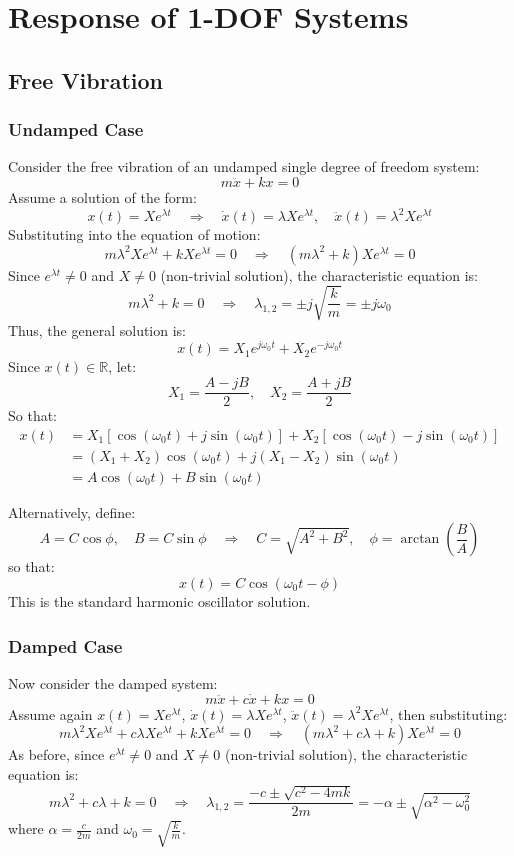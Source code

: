 
\chapter{Response of 1-DOF Systems}

\section{Free Vibration}

\subsection{Undamped Case}

Consider the free vibration of an undamped single degree of freedom system:
\[
m \ddot{x} + kx = 0
\]
Assume a solution of the form:
\[
x(t) = X e^{\lambda t} \quad \Rightarrow \quad \dot{x}(t) = \lambda X e^{\lambda t}, \quad \ddot{x}(t) = \lambda^2 X e^{\lambda t}
\]
Substituting into the equation of motion:
\[
m \lambda^2 X e^{\lambda t} + k X e^{\lambda t} = 0 \quad \Rightarrow \quad (m \lambda^2 + k) X e^{\lambda t} = 0
\]
Since \( e^{\lambda t} \neq 0 \) and \( X \neq 0 \) (non-trivial solution), the characteristic equation is:
\[
m \lambda^2 + k = 0 \quad \Rightarrow \quad \lambda_{1,2} = \pm j \sqrt{\frac{k}{m}} = \pm j \omega_0
\]
Thus, the general solution is:
\[
x(t) = X_1 e^{j \omega_0 t} + X_2 e^{-j \omega_0 t}
\]
Since \( x(t) \in \mathbb{R} \), let:
\[
X_1 = \frac{A - jB}{2}, \quad X_2 = \frac{A + jB}{2}
\]
So that:
\begin{align*}
x(t) &= X_1 \left[ \cos(\omega_0 t) + j \sin(\omega_0 t) \right] + X_2 \left[ \cos(\omega_0 t) - j \sin(\omega_0 t) \right] \\
&= (X_1 + X_2) \cos(\omega_0 t) + j (X_1 - X_2) \sin(\omega_0 t) \\
&= A \cos(\omega_0 t) + B \sin(\omega_0 t)
\end{align*}

Alternatively, define:
\[
A = C \cos \phi, \quad B = C \sin \phi \quad \Rightarrow \quad C = \sqrt{A^2 + B^2}, \quad \phi = \arctan\left( \frac{B}{A} \right)
\]
so that:
\[
x(t) = C \cos(\omega_0 t - \phi)
\]
This is the standard harmonic oscillator solution.

\subsection{Damped Case}

Now consider the damped system:
\[
m \ddot{x} + c \dot{x} + k x = 0
\]
Assume again \( x(t) = X e^{\lambda t} \), \( \dot{x}(t) = \lambda X e^{\lambda t} \), \( \ddot{x}(t) = \lambda^2 X e^{\lambda t} \), then substituting:
\[
m \lambda^2 X e^{\lambda t} + c \lambda X e^{\lambda t} + k X e^{\lambda t} = 0
\quad \Rightarrow \quad 
(m \lambda^2 + c \lambda + k) X e^{\lambda t} = 0
\]
As before, since \( e^{\lambda t} \neq 0 \) and \( X \neq 0 \) (non-trivial solution), the characteristic equation is:
\[
m \lambda^2 + c \lambda + k = 0 
\quad \Rightarrow \quad
\lambda_{1,2} = \frac{-c \pm \sqrt{c^2 - 4mk}}{2m} = -\alpha \pm \sqrt{\alpha^2 - \omega_0^2}
\]
where \( \alpha = \frac{c}{2m} \) and \( \omega_0 = \sqrt{\frac{k}{m}} \).

